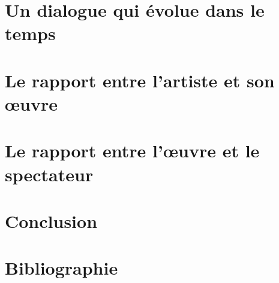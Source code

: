 
\partseparator
\newpage
\section{Un dialogue qui évolue dans le temps}

\chapterseparator

\chapterseparator

\chapterseparator


\partseparator
\newpage

\section{Le rapport entre l'artiste et son \oe{}uvre}

\chapterseparator
\newpage

	

\partseparator
\newpage

\section{Le rapport entre l'\oe{}uvre et le spectateur}

\chapterseparator

\chapterseparator


\partseparator
\newpage
\section*{Conclusion}

\partseparator
\newpage
\section{Bibliographie}

\vspace{2cm}
\chapterseparator


